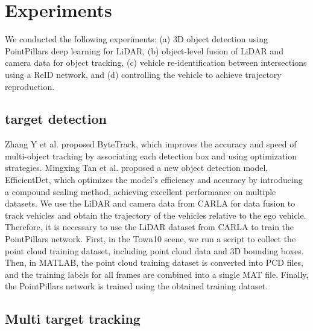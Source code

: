 \section{Experiments}

We conducted the following experiments: 
(a) 3D object detection using PointPillars deep learning for LiDAR, 
(b) object-level fusion of LiDAR and camera data for object tracking, 
(c) vehicle re-identification between intersections using a ReID network, and 
(d) controlling the vehicle to achieve trajectory reproduction.

\subsection{target detection}

Zhang Y et al. proposed ByteTrack, which improves the accuracy and speed of multi-object tracking by associating each detection box and using optimization strategies.\cite{Alpher22b}
Mingxing Tan et al. proposed a new object detection model, EfficientDet, which optimizes the model's efficiency and accuracy by introducing a compound scaling method, achieving excellent performance on multiple datasets.\cite{Alpher20b}
We use the LiDAR and camera data from CARLA for data fusion to track vehicles and obtain the trajectory of the vehicles relative to the ego vehicle. 
Therefore, it is necessary to use the LiDAR dataset from CARLA to train the PointPillars network.
First, in the Town10 scene, we run a script to collect the point cloud training dataset, including point cloud data and 3D bounding boxes.
Then, in MATLAB, the point cloud training dataset is converted into PCD files, and the training labels for all frames are combined into a single MAT file.
Finally, the PointPillars network is trained using the obtained training dataset.

\subsection{Multi target tracking}

